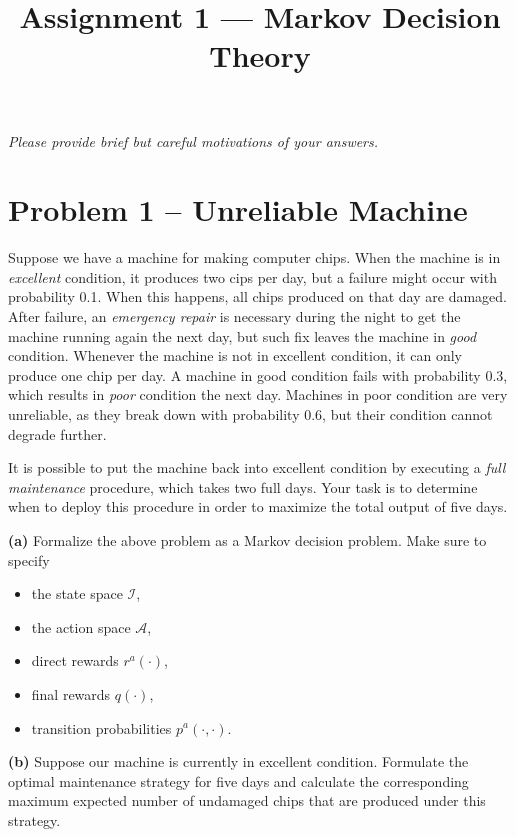 \documentclass{article}
\title{Assignment 1 --- Markov Decision Theory}
\author{}
\date{}
\begin{document}
\maketitle
\vspace{-5em}

\noindent
\textit{Please provide brief but careful motivations of your answers.}

\section*{Problem 1 -- Unreliable Machine}

Suppose we have a machine for making computer chips.
When the machine is in \textit{excellent} condition, it produces two cips per day, but
a failure might occur with probability 0.1. 
When this happens, all chips produced on that day are damaged.
After failure, an \textit{emergency repair} is necessary during the night to get the machine running again the next day, but such fix leaves the machine in \textit{good} condition.
Whenever the machine is not in excellent condition, it can only produce one chip per day.
A machine in good condition fails with probability 0.3, which results in \textit{poor} condition the next day.
Machines in poor condition are very unreliable, as they break down with probability 0.6, but their condition cannot degrade further.

It is possible to put the machine back into excellent condition by executing a \textit{full maintenance} procedure, which takes two full days.
Your task is to determine when to deploy this procedure in order to maximize the total output of five days.


\vspace{1em}
\noindent
\textbf{(a)}
Formalize the above problem as a Markov decision problem. Make sure to specify
\begin{itemize}
    \item the state space $\mathcal{I}$,
    \item the action space $\mathcal{A}$,
    \item direct rewards $r^{a}(\cdot)$,
    \item final rewards $q(\cdot)$,
    \item transition probabilities $p^{a}(\cdot, \cdot)$.
\end{itemize}

\vspace{1em}
\noindent
\textbf{(b)}
Suppose our machine is currently in excellent condition.
Formulate the optimal maintenance strategy for five days and calculate the corresponding maximum expected number of undamaged chips that are produced under this strategy.
\end{document}
